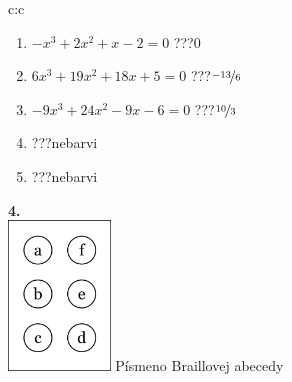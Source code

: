 \documentclass[10pt]{report}
\begin{document}
\begin{tabular}{c:c}
\begin{minipage}[c][104.5mm][t]{0.5\linewidth}
\begin{center}
\begin{minipage}{0.79\linewidth}
\begin{center}
\begin{varwidth}{\linewidth}
\begin{enumerate}
\item $-x^3+2x^2+x-2=0$\quad \dotfill\; ???\;\dotfill \quad $0$
\item $6x^3+19x^2+18x+5=0$\quad \dotfill\; ???\;\dotfill \quad $\nicefrac{-13}{6}$
\item $-9x^3+24x^2-9x-6=0$\quad \dotfill\; ???\;\dotfill \quad $\nicefrac{10}{3}$
\item \quad \dotfill\; ???\;\dotfill \quad nebarvi
\item \quad \dotfill\; ???\;\dotfill \quad nebarvi
\end{enumerate}
\end{varwidth}
\end{center}
\end{minipage}
\begin{minipage}{0.20\linewidth}
\begin{center}
{\Huge\bfseries 4.} \\[2mm]
\includegraphics[height=40mm]{../images/braille.png}
{\small Písmeno Braillovej abecedy}
\end{center}
\end{minipage}
\end{center}
\end{minipage}
%
\end{tabular}
\newpage
\thispagestyle{empty}
\end{document}
